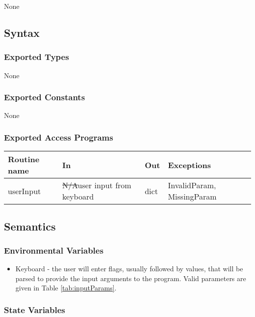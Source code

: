 \documentclass{article}
\begin{document}
None

\subsection* {Syntax}

\subsubsection* {Exported Types}

None

\subsubsection* {Exported Constants}

None

\subsubsection* {Exported Access Programs}

\begin{tabular}{| l | l | l | p{5cm} |}
\hline
\textbf{Routine name} & \textbf{In} & \textbf{Out} & \textbf{Exceptions}\\
\hline
userInput & \st{N/A}\color{red}user input from keyboard & dict & InvalidParam, MissingParam \\
\hline

\end{tabular}

\subsection* {Semantics}

\subsubsection* {Environmental Variables}

\begin{itemize}
\item Keyboard \color{red}- the user will enter flags, usually followed by values, that will be parsed to provide the input arguments to the program. Valid parameters are given in Table \ref{tab:inputParams}.\color{black}
\end{itemize}

\subsubsection* {State Variables}
\end{document}
